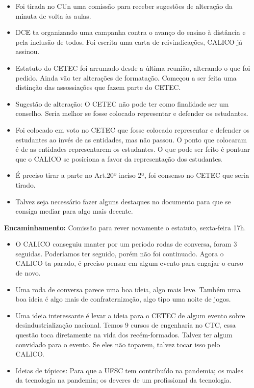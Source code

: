 \documentclass{ata-calico}
\begin{document}
\maketitle

\begin{itemize}
\item Foi tirada no CUn uma comissão para receber sugestões de alteração da minuta de volta às aulas.
\item DCE ta organizando uma campanha contra o avanço do ensino à distância e pela inclusão de todos. Foi escrita uma carta de reivindicações, CALICO já assinou.
\end{itemize}

\begin{itemize}
\item Estatuto do CETEC foi arrumado desde a última reunião, alterando o que foi pedido. Ainda vão ter alterações de formatação. Começou a ser feita uma distinção das assossiações que fazem parte do CETEC.
\item Sugestão de alteração: O CETEC não pode ter como finalidade ser um conselho. Seria melhor se fosse colocado representar e defender os estudantes.
\item Foi colocado em voto no CETEC que fosse colocado representar e defender os estudantes ao invés de as entidades, mas não passou. O ponto que colocaram é de as entidades representarem os estudantes. O que pode ser feito é pontuar que o CALICO se posiciona a favor da representação dos estudantes.
\item É preciso tirar a parte no Art.20º inciso 2º, foi consenso no CETEC que seria tirado.
\item Talvez seja necessário fazer alguns destaques no documento para que se consiga mediar para algo mais decente. 
\end{itemize}

\textbf{Encaminhamento:} Comissão para rever novamente o estatuto, sexta-feira 17h.

\begin{itemize}
\item O CALICO conseguiu manter por um período rodas de conversa, foram 3 seguidas. Poderíamos ter seguido, porém não foi continuado. Agora o CALICO ta parado, é preciso pensar em algum evento para engajar o curso de novo.
\item Uma roda de conversa parece uma boa ideia, algo mais leve. Também uma boa ideia é algo mais de confraternização, algo tipo uma noite de jogos.
\item Uma ideia interessante é levar a ideia para o CETEC de algum evento sobre desindustrialização nacional. Temos 9 cursos de engenharia no CTC, essa questão toca diretamente na vida dos recém-formados. Talvez ter algum convidado para o evento. Se eles não toparem, talvez tocar isso pelo CALICO.
\item Ideias de tópicos: Para que a UFSC tem contribuído na pandemia; os males da tecnologia na pandemia; os deveres de um profissional da tecnologia.
\end{itemize}
\end{document}
